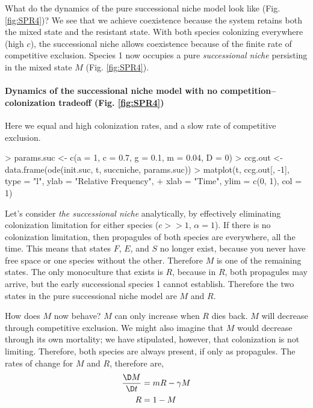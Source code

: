 What do the dynamics of the pure successional niche model look like (Fig. \ref{fig:SPR4})? We see that we achieve coexistence because the system retains both the mixed state and the resistant state. With both species colonizing everywhere (high $c$), the successional niche allows coexistence because of the finite rate of competitive exclusion. Species 1 now occupies a pure \emph{successional niche} persisting in the mixed state $M$ (Fig. \ref{fig:SPR4}).

\medskip \noindent
\begin{boxedminipage}{\linewidth}
  {\footnotesize
\paragraph{Dynamics of the successional niche model with no competition--colonization tradeoff (Fig. \ref{fig:SPR4})}
Here we equal and high colonization rates, and a slow rate of competitive exclusion.
\begin{Schunk}
\begin{Sinput}
> params.suc <- c(a = 1, c = 0.7, g = 0.1, m = 0.04, D = 0)
> ccg.out <- data.frame(ode(init.suc, t, succniche, params.suc))
> matplot(t, ccg.out[, -1], type = "l", ylab = "Relative Frequency", 
+     xlab = "Time", ylim = c(0, 1), col = 1)
\end{Sinput}
\end{Schunk}
}
\end{boxedminipage} \medskip

Let's consider \emph{the successional niche} analytically, by effectively eliminating colonization limitation for either species ($c>>1$, $\alpha=1$). If there is no colonization limitation, then propagules of both species are everywhere, all the time. This means that states $F$, $E$, and $S$ no longer exist, because you never have free space or one species without the other. Therefore $M$ is one of the remaining states. The only monoculture that exists is $R$, because in $R$, both propagules may arrive, but the early successional species 1 cannot establish. Therefore the two states in the pure successional niche model are $M$ and $R$.

How does $M$ now behave? $M$ can only increase when $R$ dies back. $M$ will decrease  through competitive exclusion. We might also imagine that $M$ would decrease through its own mortality; we have stipulated, however, that colonization is not limiting. Therefore, both species are always present, if only as propagules. The rates of change for $M$ and $R$, therefore are,
\begin{align*}
  \frac{\D M}{\D t} &= mR - \gamma M\\
  R &= 1 -M\\
\end{align*}

